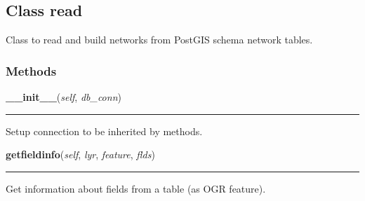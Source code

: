 \subsection{Class read}

    \label{nx_pgnet:read}
Class to read and build networks from PostGIS schema network tables.



  \subsubsection{Methods}

    \label{nx_pgnet:read:__init__}

    \vspace{0.5ex}

\hspace{.8\funcindent}\begin{boxedminipage}{\funcwidth}

    \raggedright \textbf{\_\_init\_\_}(\textit{self}, \textit{db\_conn})

    \vspace{-1.5ex}

    \rule{\textwidth}{0.5\fboxrule}
\setlength{\parskip}{2ex}
    Setup connection to be inherited by methods.

\setlength{\parskip}{1ex}
    \end{boxedminipage}

    \label{nx_pgnet:read:getfieldinfo}

    \vspace{0.5ex}

\hspace{.8\funcindent}\begin{boxedminipage}{\funcwidth}

    \raggedright \textbf{getfieldinfo}(\textit{self}, \textit{lyr}, \textit{feature}, \textit{flds})

    \vspace{-1.5ex}

    \rule{\textwidth}{0.5\fboxrule}
\setlength{\parskip}{2ex}
    Get information about fields from a table (as OGR feature).

\setlength{\parskip}{1ex}
    \end{boxedminipage}

